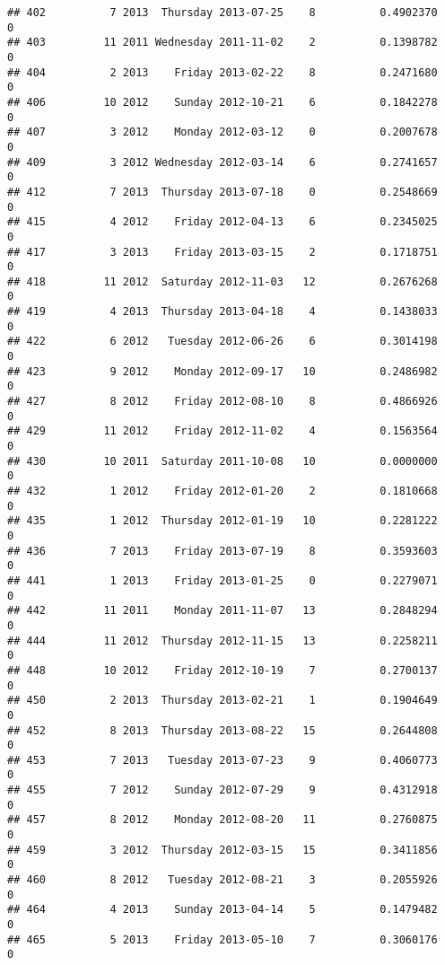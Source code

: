 \documentclass[
]{article}
\begin{document}
\begin{verbatim}
## 402          7 2013  Thursday 2013-07-25    8          0.4902370             0
## 403         11 2011 Wednesday 2011-11-02    2          0.1398782             0
## 404          2 2013    Friday 2013-02-22    8          0.2471680             0
## 406         10 2012    Sunday 2012-10-21    6          0.1842278             0
## 407          3 2012    Monday 2012-03-12    0          0.2007678             0
## 409          3 2012 Wednesday 2012-03-14    6          0.2741657             0
## 412          7 2013  Thursday 2013-07-18    0          0.2548669             0
## 415          4 2012    Friday 2012-04-13    6          0.2345025             0
## 417          3 2013    Friday 2013-03-15    2          0.1718751             0
## 418         11 2012  Saturday 2012-11-03   12          0.2676268             0
## 419          4 2013  Thursday 2013-04-18    4          0.1438033             0
## 422          6 2012   Tuesday 2012-06-26    6          0.3014198             0
## 423          9 2012    Monday 2012-09-17   10          0.2486982             0
## 427          8 2012    Friday 2012-08-10    8          0.4866926             0
## 429         11 2012    Friday 2012-11-02    4          0.1563564             0
## 430         10 2011  Saturday 2011-10-08   10          0.0000000             0
## 432          1 2012    Friday 2012-01-20    2          0.1810668             0
## 435          1 2012  Thursday 2012-01-19   10          0.2281222             0
## 436          7 2013    Friday 2013-07-19    8          0.3593603             0
## 441          1 2013    Friday 2013-01-25    0          0.2279071             0
## 442         11 2011    Monday 2011-11-07   13          0.2848294             0
## 444         11 2012  Thursday 2012-11-15   13          0.2258211             0
## 448         10 2012    Friday 2012-10-19    7          0.2700137             0
## 450          2 2013  Thursday 2013-02-21    1          0.1904649             0
## 452          8 2013  Thursday 2013-08-22   15          0.2644808             0
## 453          7 2013   Tuesday 2013-07-23    9          0.4060773             0
## 455          7 2012    Sunday 2012-07-29    9          0.4312918             0
## 457          8 2012    Monday 2012-08-20   11          0.2760875             0
## 459          3 2012  Thursday 2012-03-15   15          0.3411856             0
## 460          8 2012   Tuesday 2012-08-21    3          0.2055926             0
## 464          4 2013    Sunday 2013-04-14    5          0.1479482             0
## 465          5 2013    Friday 2013-05-10    7          0.3060176             0

\end{verbatim}
\end{document}
